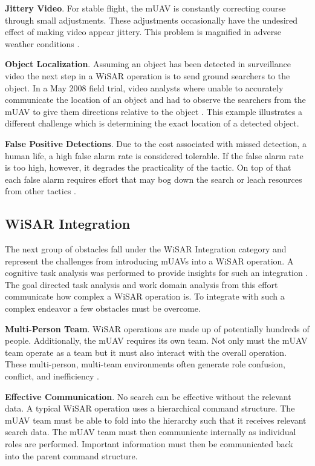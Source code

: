 \documentclass[12pt]{IEEEtran}
\begin{document}
\textbf{Jittery Video}.  For stable flight, the mUAV is constantly correcting
course through small adjustments.  These adjustments occasionally have the
undesired effect of making video appear jittery.  This problem is magnified
in adverse weather conditions \cite{goodrich2009towards}.

\textbf{Object Localization}.  Assuming an object
has been detected in surveillance video the next step in a WiSAR operation is to send ground
searchers to the object.
In a May 2008 field trial, video analysts where unable to accurately communicate
the location of an object and had to observe the searchers from the mUAV to give
them directions relative to the object \cite{goodrich2009towards}.  This example
illustrates a different challenge which is determining the exact location of a
detected object.

\textbf{False Positive Detections}.  Due to the cost associated with missed
detection, a human life, a high false alarm rate is considered tolerable.  If
the false alarm rate is too high, however, it degrades the practicality of the
tactic.  On top of that each false alarm requires effort that may bog down the
search or leach resources from other tactics \cite{goodrich2008supporting}.

\subsection{WiSAR Integration}
The next group of obstacles fall under the WiSAR Integration category and
represent the challenges from introducing mUAVs into a WiSAR operation.
A cognitive task analysis was performed to provide
insights for such an integration  \cite{adams2009cognitive}.  The goal directed
task analysis and work domain analysis from this effort communicate how complex a
WiSAR operation is.  To integrate with such a complex endeavor a few obstacles
must be overcome.

\textbf{Multi-Person Team}.  WiSAR operations are made up
of potentially hundreds of people.  Additionally, the mUAV requires its own
team.  Not only must the mUAV team operate as a team but it must also interact
with the overall operation.  These multi-person, multi-team environments often
generate role confusion, conflict, and inefficiency
\cite{goodrich2008supporting}.

\textbf{Effective Communication}.  No search can be
effective without the relevant data.  A typical WiSAR operation uses a
hierarchical command structure.  The mUAV team must be able to fold into the
hierarchy such that it receives relevant search data.  The mUAV team must then
communicate internally as individual roles are performed.  Important information
must then be communicated back into the parent command structure.
\end{document}
